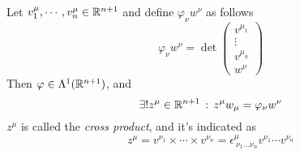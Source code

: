 \documentclass[../complete.tex]{subfiles}
\begin{document}
\begin{dfn}
	Let $v^\mu_1,\cdots,v^\mu_n\in\mathbb{R}^{n+1}$ and define $\varphi_\nu w^\nu$ as follows
	\begin{equation*}
		\varphi_\nu w^\nu=\det\begin{pmatrix}v^{\mu_1}\\\vdots\\v^{\mu_n}\\w^\nu\end{pmatrix}
	\end{equation*}
	Then $\varphi\in\Lambda^1(\mathbb{R}^{n+1})$, and
	\begin{equation*}
		\exists!z^\mu\in\mathbb{R}^{n+1}\, :\,  z^\mu w_\mu=\varphi_\nu w^\nu
	\end{equation*}
	$z^\mu$ is called the \textit{cross product}, and it's indicated as
	\begin{equation*}
		z^\mu=v^{\nu_1}\times\cdots\times v^{\nu_n}=\epsilon^{\mu}_{\ \nu_1\ldots\nu_n}v^{\nu_1}\cdots v^{\nu_n}
	\end{equation*}
\end{dfn}
\end{document}
